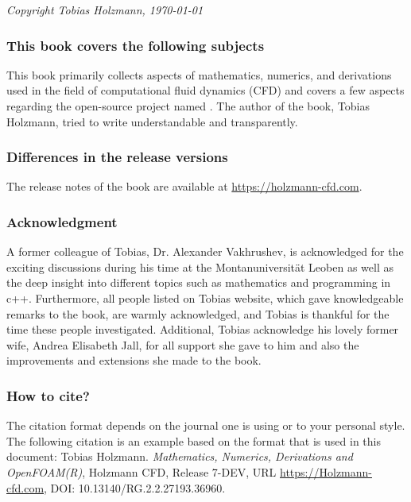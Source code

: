 \documentclass[LBMDerivation.tex]{subfiles}
\begin{document}
%
%
\textit{Copyright Tobias Holzmann, \today}
%
%
\vspace{1cm}



\subsubsection*{This book covers the following subjects}
%
%
%
%
    This book primarily collects aspects of mathematics, numerics, and
    derivations used in the field of computational fluid dynamics (CFD) and
    covers a few aspects regarding the open-source project named \OF.
    The author of the book, Tobias Holzmann, tried to write understandable and
    transparently.
%
%
%
%
%
\subsubsection*{Differences in the release versions}
%
%
	The release notes of the book are available at \url{https://holzmann-cfd.com}.
%
%
%
%
\subsubsection*{Acknowledgment}
%
%
%
%
    A former colleague of Tobias, Dr. Alexander Vakhrushev, is acknowledged for
    the exciting discussions during his time at the Montanuniversität Leoben
    as well as the deep insight into different topics such as mathematics and
    programming in c++. Furthermore, all people listed on Tobias website, which
    gave knowledgeable remarks to the book, are warmly acknowledged, and Tobias
    is thankful for the time these people investigated. Additional, Tobias
    acknowledge his lovely former wife, Andrea Elisabeth Jall, for all support
    she gave to him and also the improvements and extensions she made to the book.
%
%
%

\subsubsection*{How to cite?}
%
%
    The citation format depends on the journal one is using or to your personal
    style. The following citation is an example based on the format that
    is used in this document:
    \vspace{0.5cm}
%
%
\newline
%
%
%
    Tobias Holzmann. \textit{Mathematics, Numerics, Derivations and OpenFOAM(R)},
    Holzmann CFD, Release 7-DEV, URL \url{https://Holzmann-cfd.com},
    DOI: 10.13140/RG.2.2.27193.36960.
\end{document}
